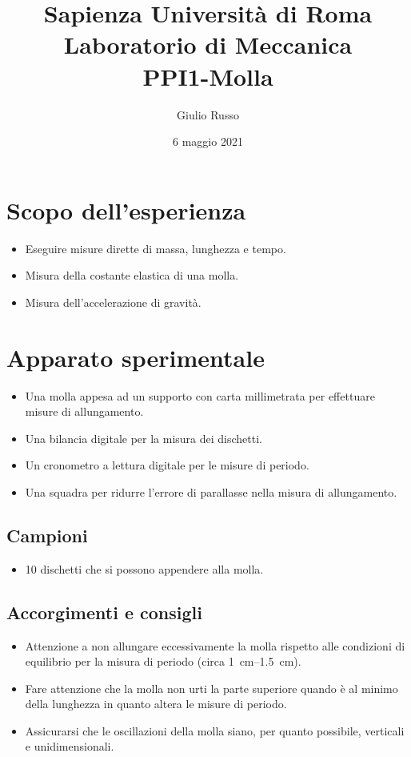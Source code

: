 \documentclass[titlepage]{article}
\title{Sapienza Università di Roma\\[1ex]Laboratorio di Meccanica\\[1ex]PPI1-Molla}
\author{Giulio Russo}
\date{6 maggio 2021}
\numberwithin{equation}{section}
\numberwithin{figure}{section}
\numberwithin{table}{section}
\begin{document}
\maketitle
\tableofcontents

\pagebreak
\section{Scopo dell'esperienza}

\begin{itemize}
  \item Eseguire misure dirette di massa, lunghezza e tempo.
  \item Misura della costante elastica di una molla.
  \item Misura dell'accelerazione di gravità.
\end{itemize}

\section{Apparato sperimentale}

\begin{itemize}
  \item Una molla appesa ad un supporto con carta millimetrata per effettuare misure di allungamento.
  \item Una bilancia digitale per la misura dei dischetti.
  \item Un cronometro a lettura digitale per le misure di periodo.
  \item Una squadra per ridurre l'errore di parallasse nella misura di allungamento.
\end{itemize}

\subsection{Campioni}

\begin{itemize}
  \item 10 dischetti che si possono appendere alla molla.
\end{itemize}

\subsection{Accorgimenti e consigli}

\begin{itemize}
  \item Attenzione a non allungare eccessivamente la molla rispetto alle condizioni di equilibrio per la misura di periodo (circa \SIrange{1}{1.5}{\centi\metre}).
  \item Fare attenzione che la molla non urti la parte superiore quando è al minimo della lunghezza in quanto altera le misure di periodo.
  \item Assicurarsi che le oscillazioni della molla siano, per quanto possibile, verticali e unidimensionali.
\end{itemize}
\end{document}
